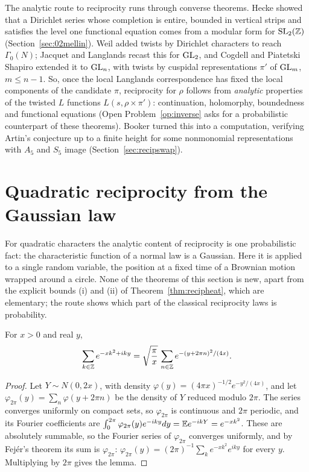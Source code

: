 The analytic route to reciprocity runs through converse theorems. Hecke \cite{hecke1936} showed that a Dirichlet series whose completion is entire, bounded in vertical strips and satisfies the level one functional equation comes from a modular form for $\mathrm{SL}_2(\mathbb{Z})$ (Section~\ref{sec:02mellin}). Weil \cite{weil1967} added twists by Dirichlet characters to reach $\Gamma_0(N)$; Jacquet and Langlands \cite{jacquetlanglands1970} recast this for $\mathrm{GL}_2$, and Cogdell and Piatetski Shapiro \cite{cogdellps1994} extended it to $\mathrm{GL}_n$, with twists by cuspidal representations $\pi'$ of $\mathrm{GL}_m$, $m\le n-1$. So, once the local Langlands correspondence has fixed the local components of the candidate $\pi$, reciprocity for $\rho$ follows from \emph{analytic} properties of the twisted $L$ functions $L(s,\rho\times\pi')$: continuation, holomorphy, boundedness and functional equations (Open Problem~\ref{op:inverse} asks for a probabilistic counterpart of these theorems). Booker \cite{booker2006} turned this into a computation, verifying Artin's conjecture up to a finite height for some nonmonomial representations with $A_5$ and $S_5$ image (Section~\ref{sec:recipswap}).

\section{Quadratic reciprocity from the Gaussian law}\label{sec:recipgauss}

For quadratic characters the analytic content of reciprocity is one probabilistic fact: the characteristic function of a normal law is a Gaussian. Here it is applied to a single random variable, the position at a fixed time of a Brownian motion wrapped around a circle. None of the theorems of this section is new, apart from the explicit bounds (i) and (ii) of Theorem~\ref{thm:recipheat}, which are elementary; the route shows which part of the classical reciprocity laws is probability.

\begin{lemma}\label{lem:recipwrap}
For $x>0$ and real $y$,
\[
\sum_{k\in\mathbb{Z}}e^{-xk^2+iky}=\sqrt{\frac\pi x}\,\sum_{n\in\mathbb{Z}}e^{-(y+2\pi n)^2/(4x)} .
\]
\end{lemma}

\begin{proof}
Let $Y\sim N(0,2x)$, with density $\varphi(y)=(4\pi x)^{-1/2}e^{-y^2/(4x)}$, and let $\varphi_{2\pi}(y)=\sum_n\varphi(y+2\pi n)$ be the density of $Y$ reduced modulo $2\pi$. The series converges uniformly on compact sets, so $\varphi_{2\pi}$ is continuous and $2\pi$ periodic, and its Fourier coefficients are $\int_0^{2\pi}\varphi_{2\pi}(y)e^{-iky}dy=\mathbb{E} e^{-ikY}=e^{-xk^2}$. These are absolutely summable, so the Fourier series of $\varphi_{2\pi}$ converges uniformly, and by Fej\'er's theorem its sum is $\varphi_{2\pi}$: $\varphi_{2\pi}(y)=(2\pi)^{-1}\sum_ke^{-xk^2}e^{iky}$ for every $y$. Multiplying by $2\pi$ gives the lemma.
\end{proof}

